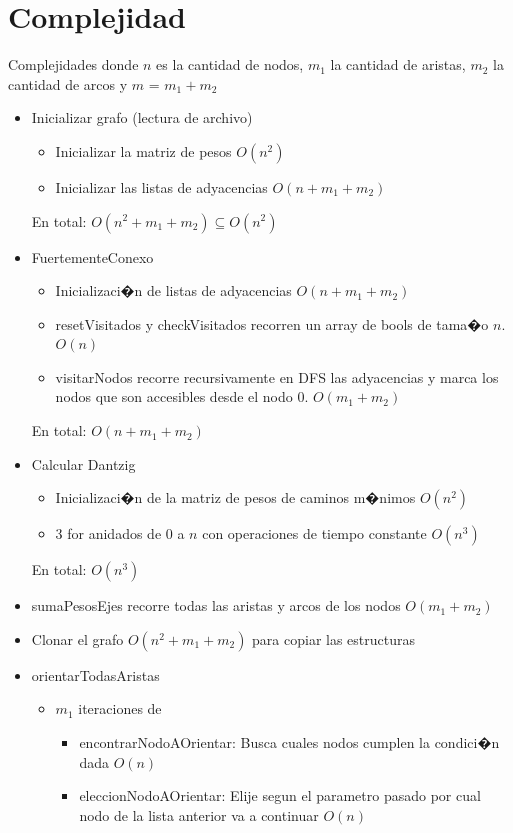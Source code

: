 \documentclass[11pt, a4paper, spanish]{article}
\begin{document}
\section{Complejidad}
Complejidades donde $n$ es la cantidad de nodos, $m_{1}$ la cantidad de aristas, $m_{2}$ la cantidad de arcos y $m$ = $m_{1} + m_{2}$ \\
\begin{itemize}
	\item Inicializar grafo (lectura de archivo)
	\begin{itemize}
		\item Inicializar la matriz de pesos $O(n^{2})$
		\item Inicializar las listas de adyacencias $O(n + m_{1} +m_{2})$
	\end{itemize}
	En total: $O(n^{2} + m_{1} +m_{2}) \subseteq O(n^{2})$
	\item FuertementeConexo
	\begin{itemize}
		\item Inicializaci�n de listas de adyacencias $O(n + m_{1} + m_{2})$
		\item resetVisitados y checkVisitados recorren un array de bools de tama�o $n$. $O(n)$
		\item visitarNodos recorre recursivamente en DFS las adyacencias y marca los nodos que son accesibles desde el nodo $0$. $O(m_{1} + m_{2})$
	\end{itemize}
	En total: $O(n + m_{1} + m_{2})$
	\item Calcular Dantzig
	\begin{itemize}	
		\item Inicializaci�n de la matriz de pesos de caminos m�nimos $O(n^{2})$
		\item 3 for anidados de $0$ a $n$ con operaciones de tiempo constante $O(n^{3})$
	\end{itemize}
	En total: $O(n^{3})$
	\item sumaPesosEjes recorre todas las aristas y arcos de los nodos $O(m_{1} + m_{2})$
	\item Clonar el grafo $O(n^{2} + m_{1} + m_{2})$ para copiar las estructuras
	\item orientarTodasAristas
	\begin{itemize}
		\item $m_{1}$ iteraciones de
		\begin{itemize}
			\item encontrarNodoAOrientar: Busca cuales nodos cumplen la condici�n dada $O(n)$
			\item eleccionNodoAOrientar: Elije segun el parametro pasado por cual nodo de la lista anterior va a continuar $O(n)$

\end{itemize}
\end{itemize}
\end{itemize}
\end{document}
